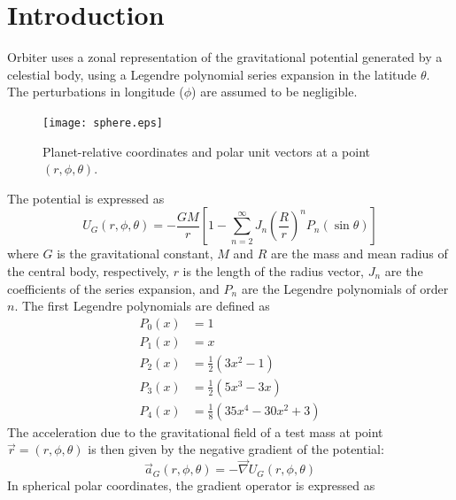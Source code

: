 \documentclass[a4paper]{article}
\begin{document}

\newcommand{\vR}[1]{\ensuremath{\vec{R}_{#1}}}
\newcommand{\nR}[1]{\ensuremath{|\vR{#1}|}}

\maketitle

\section{Introduction}
Orbiter uses a zonal representation of the gravitational potential generated by a celestial body, using a Legendre polynomial series expansion in the latitude $\theta$. The perturbations in longitude ($\phi$) are assumed to be negligible.
\begin{figure}\centering
\texttt{[image: sphere.eps]}
\caption{Planet-relative coordinates and polar unit vectors at a point $(r,\phi,\theta)$.}
\end{figure}
The potential is expressed as
\begin{equation}\label{eq:gpot}
U_G(r,\phi,\theta) = -\frac{GM}{r} \left[ 1 - \sum_{n=2}^\infty J_n \left(\frac{R}{r}\right)^n P_n(\sin \theta) \right]
\end{equation}
where $G$ is the gravitational constant, $M$ and $R$ are the mass and mean radius of the central body, respectively, $r$ is the length of the radius vector, $J_n$ are the coefficients of the series expansion, and $P_n$ are the Legendre polynomials of order $n$.
The first Legendre polynomials are defined as
\begin{equation}
\begin{split}
P_0(x) &= 1\\
P_1(x) &= x\\
P_2(x) &= \frac{1}{2}(3x^2 - 1)\\
P_3(x) &= \frac{1}{2}(5x^3 - 3x)\\
P_4(x) &= \frac{1}{8}(35x^4 - 30x^2 +3)
\end{split}
\end{equation}
The acceleration due to the gravitational field of a test mass at point $\vec{r} = (r,\phi,\theta)$ is then given by the negative gradient of the potential:
\begin{equation}\label{eq:gacc}
\vec{a}_G(r,\phi,\theta) = -\vec{\nabla} U_G(r,\phi,\theta)
\end{equation}
In spherical polar coordinates, the gradient operator is expressed as
\end{document}
